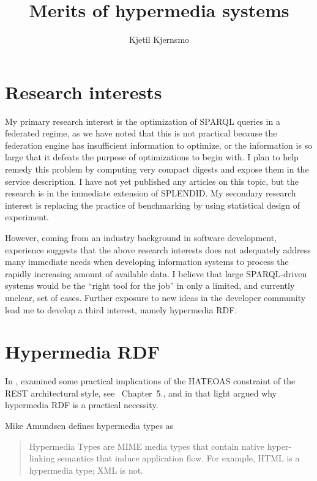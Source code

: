 \documentclass{article}
\title{Merits of hypermedia systems}
\author{Kjetil Kjernsmo}
\begin{document}
\maketitle

\section{Research interests}

My primary research interest is the optimization of SPARQL queries in
a federated regime, as we have noted that this is not practical
because the federation engine has insufficient information to
optimize, or the information is so large that it defeats the purpose
of optimizations to begin with. I plan to help remedy this problem by
computing very compact digests and expose them in the service
description. I have not yet published any articles on this topic, but
the research is in the immediate extension of
SPLENDID\cite{splendid}. My secondary research interest is replacing
the practice of benchmarking by using statistical design of
experiment. 

However, coming from an industry background in software development,
experience suggests that the above research interests does not
adequately address many immediate needs when developing information
systems to process the rapidly increasing amount of available data. I
believe that large SPARQL-driven systems would be the ``right tool for
the job'' in only a limited, and currently unclear, set of
cases. Further exposure to new ideas in the developer community lead
me to develop a third interest, namely hypermedia RDF. 

\section{Hypermedia RDF}

In \cite{kjernsmo_lapis_2012}, examined some practical implications of
the HATEOAS constraint of the REST architectural style, see
\cite{Fielding_2000_Architectural-Styles}~Chapter~5., and in that
light argued why hypermedia RDF is a practical necessity.

Mike Amundsen defines hypermedia types\cite{hypermediatypes} as 
\begin{quote}
Hypermedia Types are MIME media types that contain native
hyper-linking semantics that induce application flow. For example,
HTML is a hypermedia type; XML is not.
\end{quote}
\end{document}

